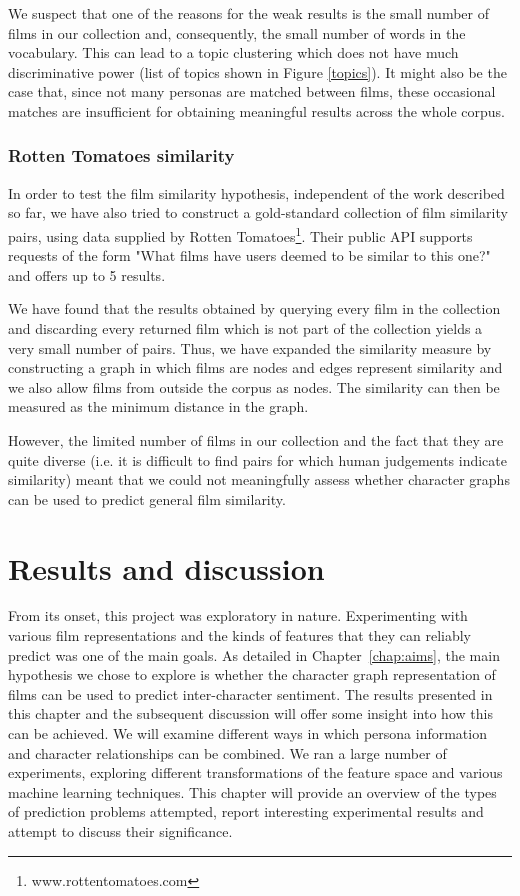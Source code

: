 \documentclass[bsc,frontabs,deptreport,singlespacing,parskip, twoside]{infthesis}
\begin{document}
We suspect that one of the reasons for the weak results is the small number of films in our collection and, consequently, the small number of words in the vocabulary. This can lead to a topic clustering which does not have much discriminative power (list of topics shown in Figure \ref{topics}). It might also be the case that, since not many personas are matched between films, these occasional matches are insufficient for obtaining meaningful results across the whole corpus.

\subsection{Rotten Tomatoes similarity}
In order to test the film similarity hypothesis, independent of the work described so far, we have also tried to construct a gold-standard collection of film similarity pairs, using data supplied by Rotten Tomatoes\footnote{www.rottentomatoes.com}. Their public API supports requests of the form "What films have users deemed to be similar to this one?" and offers up to 5 results.

We have found that the results obtained by querying every film in the collection and discarding every returned film which is not part of the collection yields a very small number of pairs. Thus, we have expanded the similarity measure by constructing a graph in which films are nodes and edges represent similarity and we also allow films from outside the corpus as nodes. The similarity can then be measured as the minimum distance in the graph.

However, the limited number of films in our collection and the fact that they are quite diverse (i.e. it is difficult to find pairs for which human judgements indicate similarity) meant that we could not meaningfully assess whether character graphs can be used to predict general film similarity. 

\chapter{Results and discussion}
\label{chap:results}

From its onset, this project was exploratory in nature. Experimenting with various film representations and the kinds of features that they can reliably predict was one of the main goals. As detailed in Chapter~\ref{chap:aims}, the main hypothesis we chose to explore is whether the character graph representation of films can be used to predict inter-character sentiment. The results presented in this chapter and the subsequent discussion will offer some insight into how this can be achieved. We will examine different ways in which persona information and character relationships can be combined. We ran a large number of experiments, exploring different transformations of the feature space and various machine learning techniques. This chapter will provide an overview of the types of prediction problems attempted, report interesting experimental results and attempt to discuss their significance.
\end{document}
